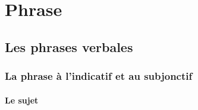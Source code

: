 \documentclass[UTF8]{report}
\begin{document}
\chapter{Phrase}







\section{Les phrases verbales}
\subsection{La phrase à l’indicatif et au subjonctif}
\subsubsection{Le sujet}
\end{document}
